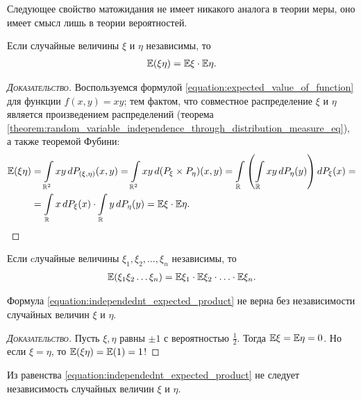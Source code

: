 \documentclass[../main.tex]{subfiles}
\begin{document}
Следующее свойство матожидания не имеет никакого аналога в теории меры, оно имеет смысл лишь в теории вероятностей.

\begin{prop}
 \label{proposition:independent_expected_product}
 Если случайные величины $ \xi $ и $ \eta $ независимы, то
 \begin{align}
  \label{equation:independednt_expected_product}
  \mathbb E(\xi \eta) = \mathbb E\xi \cdot \mathbb E\eta.
 \end{align} 
\end{prop}
\begin{proof}[\normalfont\textsc{Доказательство}]
 Воспользуемся формулой \eqref{equation:expected_value_of_function} для функции $ f(x,y) = xy $; тем фактом, что совместное распределение $ \xi $ и $ \eta $ является произведением распределений (теорема \ref{theorem:random_variable_independence_through_distribution_measure_eq}), а также теоремой Фубини:
 \begin{align*}
  \mathbb E(\xi\eta) &= \int\limits_{\mathbb{R}^{2}} xy \,dP_{(\xi,\eta)} (x,y) = \int\limits_{\mathbb{R}^{2}} xy\,d(P_{\xi} \times P_{\eta})(x,y) = \int\limits_{\mathbb{R}} \left( \int\limits_{\mathbb{R}} xy\,dP_\eta(y)  \right) dP_\xi(x) = \\
  &=  \int\limits_{\mathbb{R}} x\,dP_\xi(x)  \cdot  \int\limits_{\mathbb{R}} y\,dP_\eta(y)   = \mathbb E \xi \cdot \mathbb E\eta.
 \end{align*} 
\end{proof}
\begin{crly}
 Если cлучайные величины $ \xi_1,\xi_2, \ldots, \xi_n $ независимы, то
 \begin{align*}
  \mathbb E(\xi_1 \xi_2 \ldots \xi_n) = \mathbb E\xi_1 \cdot \mathbb E\xi_2 \cdot \ldots \cdot \mathbb E\xi_n.
 \end{align*} 
\end{crly}
\begin{remrk}
 Формула \eqref{equation:independednt_expected_product} не верна без независимости случайных величин $ \xi $ и $ \eta $.
\end{remrk}
\begin{proof}[\normalfont\textsc{Доказательство}]
 Пусть $ \xi, \eta $ равны $ \pm 1 $ с вероятностью $ \frac{1}{2} $. Тогда $ \mathbb E\xi = \mathbb E\eta = 0 $. Но если $ \xi = \eta $, то $ \mathbb E(\xi\eta) = \mathbb E(1) = 1 $!
\end{proof}
\begin{remrk}
 Из равенства \eqref{equation:independednt_expected_product} не следует независимость случайных величин $ \xi $ и $ \eta $.
\end{remrk}
\end{document}
